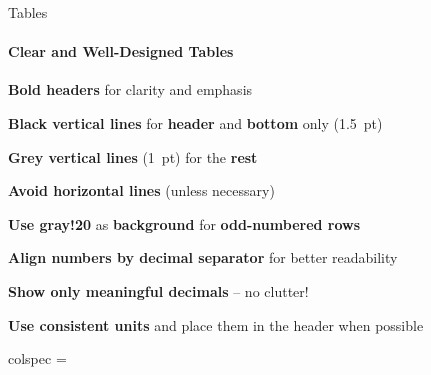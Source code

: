 \documentclass[aspectratio=169]{beamer}
\begin{document}
\begin{frame}{Tables}
    \framesubtitle{Clear and Well-Designed Tables}

    \vspace{-0.7cm}
    \begin{minipage}[t]{0.49\textwidth}
        \begin{coloredblock}
            \vspace{0.2cm}
            \begin{tugitemize}
                \item \footnotesize \textbf{Bold headers} for clarity and emphasis
                \item \textbf{Black vertical lines} for \textbf{header} and \textbf{bottom} only (1.5~pt) 
                \item \textbf{Grey vertical lines} (1~pt) for the \textbf{rest}
                \item \footnotesize \textbf{Avoid horizontal lines} (unless necessary)
                \item \footnotesize \textbf{Use gray!20} as \textbf{background} for \textbf{odd-numbered rows}
            \end{tugitemize}
        \end{coloredblock}
        \begin{coloredblock}
            \vspace{0.2cm}
            \begin{tugitemize}
                \item \footnotesize \textbf{Align numbers by decimal separator} for better readability
                \item \footnotesize \textbf{Show only meaningful decimals} – no clutter!
                \item \footnotesize \textbf{Use consistent units} and place them in the header when possible
            \end{tugitemize}
        \end{coloredblock}
    \end{minipage}
    \hfill
    \begin{minipage}[t]{0.49\textwidth}
        \vspace{2cm}
        \begin{table}[htbp]
            \centering
            \small
            \begin{tblr}{
                  colspec = {
}}
\end{tblr}
\end{table}
\end{minipage}
\end{frame}
\end{document}
